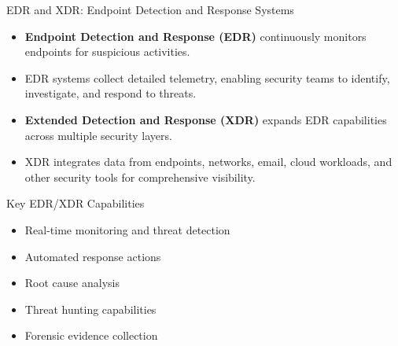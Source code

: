 \documentclass{beamer}
\begin{document}
                        \begin{frame}{EDR and XDR: Endpoint Detection and Response Systems}
                        \begin{itemize}
                            \item \textbf{Endpoint Detection and Response (EDR)} continuously monitors endpoints for suspicious activities.
                            \item EDR systems collect detailed telemetry, enabling security teams to identify, investigate, and respond to threats.
                            \item \textbf{Extended Detection and Response (XDR)} expands EDR capabilities across multiple security layers.
                            \item XDR integrates data from endpoints, networks, email, cloud workloads, and other security tools for comprehensive visibility.
                        \end{itemize}
                        
                        \begin{alertblock}{Key EDR/XDR Capabilities}
                        \begin{itemize}
                            \item Real-time monitoring and threat detection
                            \item Automated response actions
                            \item Root cause analysis
                            \item Threat hunting capabilities
                            \item Forensic evidence collection
                        \end{itemize}
                        \end{alertblock}
                        \end{frame}
                        
\end{document}
